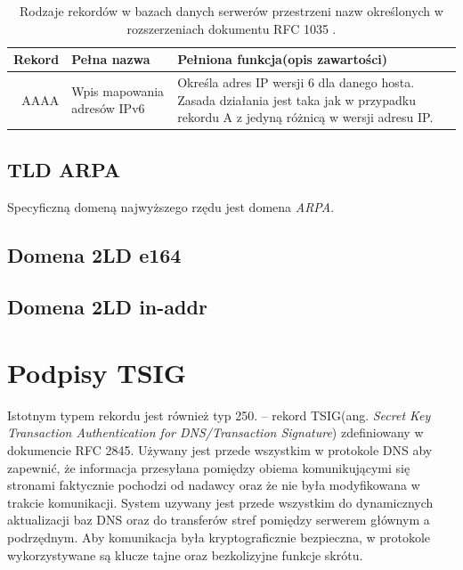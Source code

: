 \begin{table}[]
	\centering
	\caption{Rodzaje rekordów w bazach danych serwerów przestrzeni nazw określonych w rozszerzeniach dokumentu RFC 1035 \cite{}.}
	\label{typyRekordowDnsExt}
	\begin{tabular}{|r|p{3cm}|p{8cm}|}
		\hline
		\textbf{Rekord} & 
		\textbf{Pełna nazwa} & 
		\textbf{Pełniona funkcja(opis zawartości)} \\
		\hline\hline
			AAAA & 
			Wpis mapowania adresów IPv6 & 
			Określa adres IP wersji 6 dla danego hosta. Zasada działania jest taka jak w przypadku rekordu A z jedyną różnicą w wersji adresu IP. \\
		\hline
	\end{tabular}
\end{table}

\subsection{TLD ARPA}
Specyficzną domeną najwyższego rzędu jest domena \textit{ARPA}.

\subsection{Domena 2LD e164}

\subsection{Domena 2LD in-addr}

\section{Podpisy TSIG}\label{TSIG}
Istotnym typem rekordu jest również typ 250. -- rekord TSIG(ang. \textit{Secret Key Transaction Authentication for DNS/Transaction Signature}) zdefiniowany w dokumencie RFC 2845\cite{RFC2845}. Używany jest przede wszystkim w protokole DNS aby zapewnić, że informacja przesyłana pomiędzy obiema komunikującymi się stronami faktycznie pochodzi od nadawcy oraz że nie była modyfikowana w trakcie komunikacji. System uzywany jest przede wszystkim do dynamicznych aktualizacji baz DNS oraz do transferów stref pomiędzy serwerem głównym a podrzędnym. Aby komunikacja była kryptograficznie bezpieczna, w protokole wykorzystywane są klucze tajne oraz bezkolizyjne funkcje skrótu.

